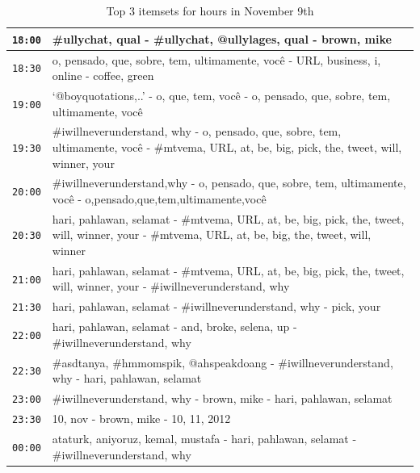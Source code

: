 \documentclass{sig-alternate}
\begin{document}
\begin{table}
\begin{tabular}{|p{.6cm}|p{7.5cm}|}
\texttt{18:00} &   \#ullychat, qual -   \#ullychat, @ullylages, qual -   brown, mike \\\hline

\texttt{18:30} &   o, pensado, que, sobre, tem, ultimamente, voc\^{e} -   URL, business, i, online -   coffee, green \\\hline

\texttt{19:00}&   `@boyquotations,..' -   o, que, tem, voc\^{e} -   o, pensado, que, sobre, tem, ultimamente, voc\^{e} \\\hline

\texttt{19:30}&   \#iwillneverunderstand, why -   o, pensado, que, sobre, tem, ultimamente, voc\^{e} -   \#mtvema, URL, at, be, big, pick, the, tweet, will, winner, your \\\hline

\texttt{20:00} &   \#iwillneverunderstand,why -   o, pensado, que, sobre, tem, ultimamente, voc\^{e} -   o,pensado,que,tem,ultimamente,voc\^{e} \\\hline

\texttt{20:30} &   hari, pahlawan, selamat -   \#mtvema, URL, at, be, big, pick, the, tweet, will, winner, your -   \#mtvema, URL, at, be, big, the, tweet, will, winner \\\hline

\texttt{21:00} &   hari, pahlawan, selamat -   \#mtvema, URL, at, be, big, pick, the, tweet, will, winner, your -   \#iwillneverunderstand, why \\\hline

\texttt{21:30} &   hari, pahlawan, selamat -   \#iwillneverunderstand, why -   pick, your \\\hline

\texttt{22:00} &   hari, pahlawan, selamat -   and, broke, selena, up -   \#iwillneverunderstand, why \\\hline

\texttt{22:30}&   \#asdtanya, \#hmmomspik, @ahspeakdoang -   \#iwillneverunderstand, why -   hari, pahlawan, selamat \\\hline

\texttt{23:00} &   \#iwillneverunderstand, why -   brown, mike -   hari, pahlawan, selamat \\\hline

\texttt{23:30}&   10, nov -   brown, mike -   10, 11, 2012 \\\hline

\texttt{00:00} &  ataturk, aniyoruz, kemal, mustafa -   hari, pahlawan, selamat -   \#iwillneverunderstand, why \\\hline
 \end{tabular}
 \caption{Top 3 itemsets for hours in November 9th}
 \label{table:nov9}
 \end{table}
\end{document}
